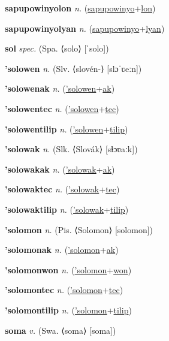 \textbf{\hypertarget{sapupowinyolon}{sapupowinyolon}} \textit{n.} (\hyperlink{sapupowinyo}{sapupowinyo}+\allowbreak \hyperlink{lon}{lon})


\textbf{\hypertarget{sapupowinyolyan}{sapupowinyolyan}} \textit{n.} (\hyperlink{sapupowinyo}{sapupowinyo}+\allowbreak \hyperlink{lyan}{lyan})


\textbf{\hypertarget{sol}{sol}} \textit{spec.} (Spa. ⟨solo⟩ [ˈsolo])


\textbf{\hypertarget{'solowen}{'solowen}} \textit{n.} (Slv. ⟨slovén-⟩ [slɔˈʋeːn])


\textbf{\hypertarget{'solowenak}{'solowenak}} \textit{n.} (\hyperlink{'solowen}{'solowen}+\allowbreak \hyperlink{ak}{ak})


\textbf{\hypertarget{'solowentec}{'solowentec}} \textit{n.} (\hyperlink{'solowen}{'solowen}+\allowbreak \hyperlink{tec}{tec})


\textbf{\hypertarget{'solowentilip}{'solowentilip}} \textit{n.} (\hyperlink{'solowen}{'solowen}+\allowbreak \hyperlink{tilip}{tilip})


\textbf{\hypertarget{'solowak}{'solowak}} \textit{n.} (Slk. ⟨Slovák⟩ [sɫɔʋaːk])


\textbf{\hypertarget{'solowakak}{'solowakak}} \textit{n.} (\hyperlink{'solowak}{'solowak}+\allowbreak \hyperlink{ak}{ak})


\textbf{\hypertarget{'solowaktec}{'solowaktec}} \textit{n.} (\hyperlink{'solowak}{'solowak}+\allowbreak \hyperlink{tec}{tec})


\textbf{\hypertarget{'solowaktilip}{'solowaktilip}} \textit{n.} (\hyperlink{'solowak}{'solowak}+\allowbreak \hyperlink{tilip}{tilip})


\textbf{\hypertarget{'solomon}{'solomon}} \textit{n.} (Pis. ⟨Solomon⟩ [solomon])


\textbf{\hypertarget{'solomonak}{'solomonak}} \textit{n.} (\hyperlink{'solomon}{'solomon}+\allowbreak \hyperlink{ak}{ak})


\textbf{\hypertarget{'solomonwon}{'solomonwon}} \textit{n.} (\hyperlink{'solomon}{'solomon}+\allowbreak \hyperlink{won}{won})


\textbf{\hypertarget{'solomontec}{'solomontec}} \textit{n.} (\hyperlink{'solomon}{'solomon}+\allowbreak \hyperlink{tec}{tec})


\textbf{\hypertarget{'solomontilip}{'solomontilip}} \textit{n.} (\hyperlink{'solomon}{'solomon}+\allowbreak \hyperlink{tilip}{tilip})


\textbf{\hypertarget{soma}{soma}} \textit{v.} (Swa. ⟨soma⟩ [soma])


